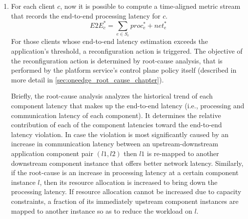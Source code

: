 \begin{enumerate}
\item For each client $c$, now it is possible to compute a time-aligned metric stream that records the end-to-end processing latency for $c$.
\begin{equation}
E2E_c^* = \sum_{e \in S_c} proc_e^* + net_e^*
\end{equation}
For those clients whose end-to-end latency estimation exceeds the application's threshold, a reconfiguration action is triggered. The objective of the reconfiguration action is determined by root-cause analysis, that is performed by the platform service's control plane policy itself (described in more detail in \cref{sec:oneedge_root_cause_chapter}). 
\par Briefly, the root-cause analysis analyzes the historical trend of each component latency that makes up the end-to-end latency (i.e., processing and communication latency of each component). It determines the relative contribution of each of the component latencies toward the end-to-end latency violation. In case the violation is most significantly caused by an increase in communication latency between an upstream-downstream application component pair $\left( l1, l2 \right)$ then $l1$ is re-mapped to another downstream component instance that offers  better network latency. Similarly, if the root-cause is an increase in processing latency at a certain component instance $l$, then its resource allocation is increased to bring down the processing latency. If resource allocation cannot be increased due to capacity constraints, a fraction of its immediately upstream component instances are mapped to another instance so as to reduce the workload on $l$. 
\end{enumerate}

